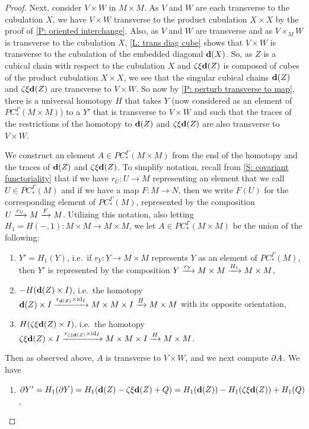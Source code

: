 \documentclass{amsart}
\begin{document}
\begin{proof}
Next, consider $V\times W$ in $M\times M$. As $V$ and $W$ are each transverse to the cubulation $X$, we have $V\times W$ transverse to the product cubulation $X\times X$ by the proof of \cref{P: oriented interchange}.
Also, as $V$ and $W$ are transverse and as $V\times_MW$ is transverse to the cubulation $X$, \cref{L: trans diag cube} shows that $V\times W$ is transverse to the cubulation of the embedded diagonal  $\mathbf{d}(X)$. So, as $Z$ is a cubical chain with respect to the cubulation $X$ and $\zeta\xi\mathbf{d}(Z)$ is composed of cubes of the product cubulation $X\times X$, we see that the singular cubical chains $\mathbf{d}(Z)$ and  $\zeta\xi\mathbf{d}(Z)$ are transverse to $V\times W$. So now by \cref{P: perturb transverse to map}, there is a universal homotopy $H$ that takes $Y$ (now considered as an element of $PC^\Gamma_*(M\times M)$) to a $Y'$ that is transverse to $V\times W$ and such that the traces of the restrictions of the homotopy to $\mathbf{d}(Z)$ and  $\zeta\xi\mathbf{d}(Z)$
are also transverse to  $V\times W$.

We construct an element $A\in PC^\Gamma_*(M\times M)$ from the end of the homotopy and the traces of $\mathbf{d}(Z)$ and $\zeta\xi\mathbf{d}(Z)$. To simplify notation, recall from \cref{S: covariant functoriality} that if we have $r_U:U\to M$ representing an element that we call $U\in PC^\Gamma_*(M)$ and if we have a map $F:M\to N$, then we write $F(U)$ for the corresponding element of $PC^\Gamma_*(M)$, represented by the composition $U\xrightarrow{r_U}M\xrightarrow{F}M$.
Utilizing this notation, also letting $H_1=H(-,1):M\times M\to M\times M$, we let $A\in PC^\Gamma_*(M\times M)$ be the union of the following:
\begin{enumerate}
\item $Y'=H_1(Y)$, i.e.\ if $r_Y:Y\to M\times M$ represents $Y$ as an element of $PC^\Gamma_*(M)$, then $Y'$ is represented by  the composition $Y\xrightarrow{r_Y} M\times M\xrightarrow{H_1}M\times M$,

\item $-H(\mathbf{d}(Z)\times I)$, i.e.\ the homotopy $\mathbf{d}(Z)\times I\xrightarrow{r_{\mathbf{d}(Z)}\times \mathrm{id}_I} M\times M\times I\xrightarrow{H}M\times M$ with its opposite orientation,

\item $H(\zeta\xi\mathbf{d}(Z)\times I)$, i.e.\ the homotopy $\zeta\xi\mathbf{d}(Z)\times I\xrightarrow{r_{\zeta\xi\mathbf{d}(Z)}\times \mathrm{id}_I} M\times M\times I\xrightarrow{H}M\times M$.
\end{enumerate}
Then as observed above, $A$ is transverse to $V\times W$, and we next compute $\partial A$. We have
\begin{enumerate}
\item $\partial Y'=H_1(\partial Y)=H_1(\mathbf{d}(Z)-\zeta\xi\mathbf{d}(Z)+Q)=H_1(\mathbf{d}(Z))-H_1(\zeta\xi\mathbf{d}(Z))+H_1(Q)$,


\end{enumerate}
\end{proof}
\end{document}
